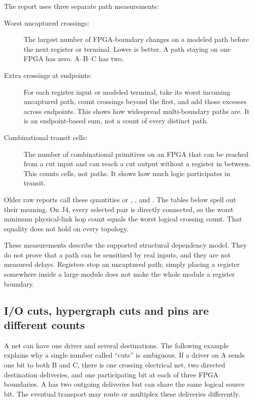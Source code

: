 \documentclass[11pt]{article}
\newcommand{\code}[1]{\texttt{\detokenize{#1}}}
\begin{document}
The report uses three separate path measurements:
\begin{description}
\item[Worst uncaptured crossings:] The largest number of FPGA-boundary changes on a modeled path before the next register or terminal. Lower is better. A path staying on one FPGA has zero. A--B--C has two.
\item[Extra crossings at endpoints:] For each register input or modeled terminal, take its worst incoming uncaptured path, count crossings beyond the first, and add those excesses across endpoints. This shows how widespread multi-boundary paths are. It is an endpoint-based sum, not a count of every distinct path.
\item[Combinational transit cells:] The number of combinational primitives on an FPGA that can be reached from a cut input and can reach a cut output without a register in between. This counts cells, not paths. It shows how much logic participates in transit.
\end{description}
Older raw reports call these quantities \code{C} or \code{H}, \code{E}, and \code{V}. The tables below spell out their meaning. On J4, every selected pair is directly connected, so the worst minimum physical-link hop count equals the worst logical crossing count. That equality does not hold on every topology.

These measurements describe the supported structural dependency model. They do not prove that a path can be sensitized by real inputs, and they are not measured delays. Registers stop an uncaptured path; simply placing a register somewhere inside a large module does not make the whole module a register boundary.

\subsection{I/O cuts, hypergraph cuts and pins are different counts}

A net can have one driver and several destinations. The following example explains why a single number called ``cuts'' is ambiguous. If a driver on A sends one bit to both B and C, there is one crossing electrical net, two directed destination deliveries, and one participating bit at each of three FPGA boundaries. A has two outgoing deliveries but can share the same logical source bit. The eventual transport may route or multiplex these deliveries differently.
\end{document}
